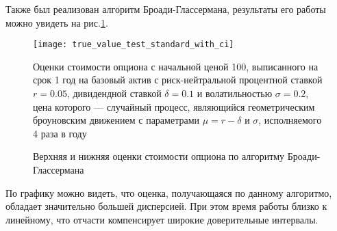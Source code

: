 Также был реализован алгоритм Броади-Глассермана, результаты его работы можно увидеть на рис.\ref{fig:true_value_test_standard}.
\begin{figure}[h]
    \centering
	\texttt{[image: true\_value\_test\_standard\_with\_ci]}
	\caption{Верхняя и нижняя оценки стоимости опциона по алгоритму Броади-Глассермана}
	\label{fig:true_value_test_standard}
	\footnotesize{Оценки стоимости опциона с начальной ценой 100, выписанного на срок 1 год на базовый актив с риск-нейтральной процентной ставкой $r = 0.05$, дивидендной ставкой $\delta = 0.1$ и волатильностью $\sigma=0.2$, цена которого --- случайный процесс, являющийся геометрическим броуновским движением с параметрами $\mu = r - \delta$ и $\sigma$, исполняемого 4 раза в году}
\end{figure}

По графику можно видеть, что оценка, получающаяся по данному алгоритмо, обладает значительно большей дисперсией. При этом время работы близко к линейному, что отчасти компенсирует широкие доверительные интервалы.